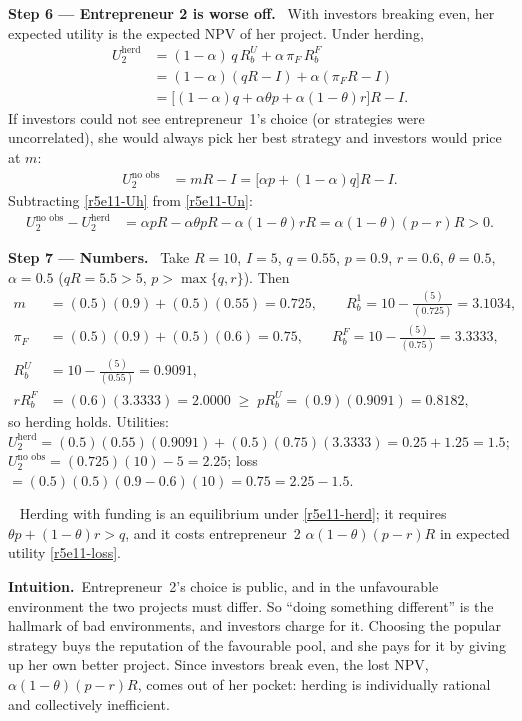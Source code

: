 \documentclass[11pt,a4paper]{article}
\newcommand{\step}[2]{\par\medskip\noindent\textbf{Step #1 --- #2.}~}
\newcommand{\intuition}{\par\medskip\noindent\textbf{Intuition.}~}
\newcommand{\answer}[1]{\par\smallskip\noindent\fbox{\textbf{Answer #1.}}~}
\begin{document}
\step{6}{Entrepreneur 2 is worse off} With investors breaking even, her expected utility is the expected NPV of her project. Under herding,
\begin{align}
  U_2^{\text{herd}} &= (1-\alpha)\,q\,R_b^U + \alpha\,\pi_F\,R_b^F \nonumber\\
   &= (1-\alpha)(qR-I) + \alpha(\pi_F R - I) \nonumber\\
   &= \bigl[(1-\alpha)q + \alpha\theta p + \alpha(1-\theta)r\bigr]R - I. \label{r5e11-Uh}
\end{align}
If investors could not see entrepreneur~1's choice (or strategies were uncorrelated), she would always pick her best strategy and investors would price at $m$:
\begin{align}
  U_2^{\text{no obs}} &= mR - I = \bigl[\alpha p + (1-\alpha)q\bigr]R - I. \label{r5e11-Un}
\end{align}
Subtracting \eqref{r5e11-Uh} from \eqref{r5e11-Un}:
\begin{align}
  U_2^{\text{no obs}} - U_2^{\text{herd}} &= \alpha pR - \alpha\theta pR - \alpha(1-\theta)rR = \alpha(1-\theta)(p-r)R > 0. \label{r5e11-loss}
\end{align}

\step{7}{Numbers} Take $R=10$, $I=5$, $q=0.55$, $p=0.9$, $r=0.6$, $\theta=0.5$, $\alpha=0.5$ ($qR=5.5>5$, $p>\max\{q,r\}$). Then
\begin{align}
  m &= (0.5)(0.9)+(0.5)(0.55) = 0.725, \qquad R_b^1 = 10 - \frac{(5)}{(0.725)} = 3.1034, \nonumber\\
  \pi_F &= (0.5)(0.9)+(0.5)(0.6) = 0.75, \qquad R_b^F = 10 - \frac{(5)}{(0.75)} = 3.3333, \nonumber\\
  R_b^U &= 10 - \frac{(5)}{(0.55)} = 0.9091, \nonumber\\
  rR_b^F &= (0.6)(3.3333) = 2.0000 \;\ge\; pR_b^U = (0.9)(0.9091) = 0.8182, \nonumber
\end{align}
so herding holds. Utilities: $U_2^{\text{herd}} = (0.5)(0.55)(0.9091)+(0.5)(0.75)(3.3333) = 0.25+1.25 = 1.5$; $U_2^{\text{no obs}} = (0.725)(10)-5 = 2.25$; loss $=(0.5)(0.5)(0.9-0.6)(10) = 0.75 = 2.25-1.5$.
\answer{\unskip} Herding with funding is an equilibrium under \eqref{r5e11-herd}; it requires $\theta p+(1-\theta)r>q$, and it costs entrepreneur~2 $\alpha(1-\theta)(p-r)R$ in expected utility \eqref{r5e11-loss}.

\intuition Entrepreneur~2's choice is public, and in the unfavourable environment the two projects must differ. So ``doing something different'' is the hallmark of bad environments, and investors charge for it. Choosing the popular strategy buys the reputation of the favourable pool, and she pays for it by giving up her own better project. Since investors break even, the lost NPV, $\alpha(1-\theta)(p-r)R$, comes out of her pocket: herding is individually rational and collectively inefficient.
\end{document}
